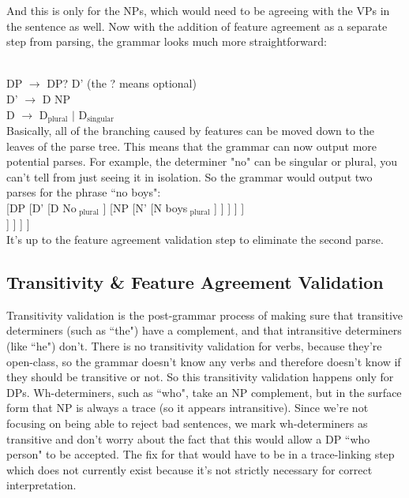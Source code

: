 \documentclass[11pt]{article}
\begin{document}
And this is only for the NPs, which would need to be agreeing with the VPs in the sentence as well.
Now with the addition of feature agreement as a separate step from parsing, the grammar looks much
more straightforward:

\ \\
\indent DP $\rightarrow$ DP? D' (the ? means optional)\\
\indent D' $\rightarrow$ D NP \\
\indent D $\rightarrow$ D$_{\text{plural}}$ $\vert$ D$_{\text{singular}}$
\\

Basically, all of the branching caused by features can be moved down to the leaves of the parse tree.
This means that the grammar can now output more potential parses. For example, the determiner "no"
can be singular or plural, you can't tell from just seeing it in isolation. So the grammar would output
two parses for the phrase ``no boys":\\

[DP [D' [D No$_{\text{ plural}}$ ] [NP [N' [N boys$_{\text{ plural}}$ ] ] ] ] ]\\
\indent [DP [D' [D No$_{\text{ singular}}$ ] [NP [N' [N boys$_{\text{ plural}}$ ] ] ] ] ]\\

It's up to the feature agreement validation step to eliminate the second parse.

\subsection{Transitivity \& Feature Agreement Validation}
Transitivity validation is the post-grammar process of making sure that transitive determiners (such
as ``the") have a complement, and that intransitive determiners (like ``he") don't. There is no
transitivity validation for verbs, because they're open-class, so the grammar doesn't know any verbs
and therefore doesn't know if they should be transitive or not. So this transitivity validation happens
only for DPs. Wh-determiners, such as ``who", take an NP complement, but in the surface form that NP
is always a trace (so it appears intransitive). Since we're not focusing on being able to reject bad
sentences, we mark wh-determiners as transitive and don't worry about the fact that this would allow
a DP ``who person" to be accepted. The fix for that would have to be in a trace-linking step which
does not currently exist because it's not strictly necessary for correct interpretation.
\end{document}

